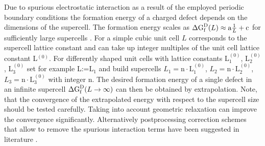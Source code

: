 Due to spurious electrostatic interaction as a result of the employed periodic boundary conditions the formation energy of a charged defect depends on the dimensions of the supercell. The formation energy scales as $\Delta {\text{G}}_{\text{f}}^{\text{D}}(L)\approx \text{a}\frac{1}{L}+\text{c}$ for sufficiently large supercells \cite{makov95}. For a simple cubic unit cell $L$ corresponds to the supercell lattice constant and can take up integer multiples of the unit cell lattice constant L$^{(0)}$. For differently shaped unit cells with lattice constants L$^{(0)}_{\text{1}}$, L$^{(0)}_{\text{2}}$, L$^{(0)}_{\text{3}}$ set for example L:=L$_\text{1}$ and build supercells $L_\text{1}=\text{n}\cdot \text{L}^{(0)}_\text{1}$, $L_\text{2}=\text{n}\cdot \text{L}^{(0)}_\text{2}$, $L_\text{3}=\text{n}\cdot \text{L}^{(0)}_\text{3}$ with integer n.
The desired formation energy of a single defect in an infinite supercell $\Delta {\text{G}}_{\text{f}}^{\text{D}}(L\rightarrow \infty)$ can then be obtained by extrapolation. Note, that the convergence of the extrapolated energy with respect to the supercell size should be tested carefully. Taking into account geometric relaxation can improve the convergence significantly. Alternatively postprocessing correction schemes that allow to remove the spurious interaction terms have been suggested in literature \cite{makov95,fre09}. 
